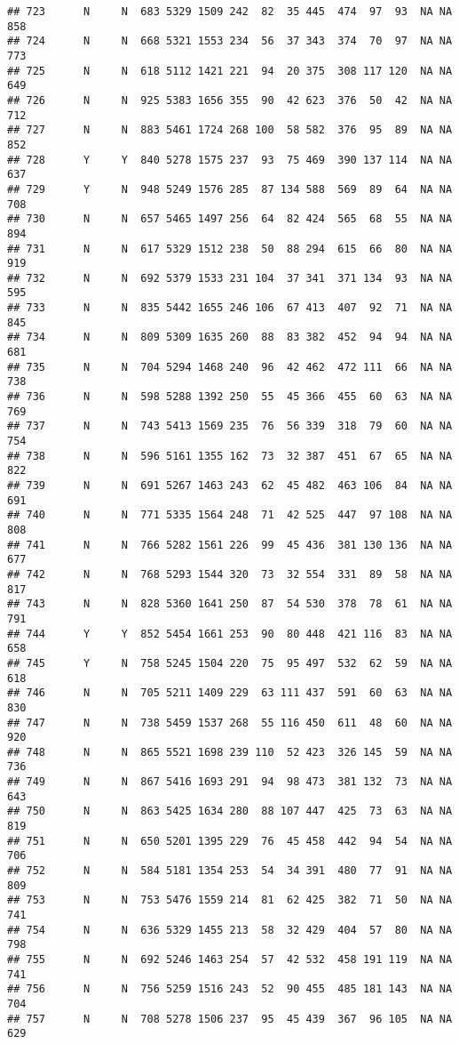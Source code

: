 \documentclass[]{article}
\begin{document}
\begin{verbatim}
## 723      N     N  683 5329 1509 242  82  35 445  474  97  93  NA NA  858
## 724      N     N  668 5321 1553 234  56  37 343  374  70  97  NA NA  773
## 725      N     N  618 5112 1421 221  94  20 375  308 117 120  NA NA  649
## 726      N     N  925 5383 1656 355  90  42 623  376  50  42  NA NA  712
## 727      N     N  883 5461 1724 268 100  58 582  376  95  89  NA NA  852
## 728      Y     Y  840 5278 1575 237  93  75 469  390 137 114  NA NA  637
## 729      Y     N  948 5249 1576 285  87 134 588  569  89  64  NA NA  708
## 730      N     N  657 5465 1497 256  64  82 424  565  68  55  NA NA  894
## 731      N     N  617 5329 1512 238  50  88 294  615  66  80  NA NA  919
## 732      N     N  692 5379 1533 231 104  37 341  371 134  93  NA NA  595
## 733      N     N  835 5442 1655 246 106  67 413  407  92  71  NA NA  845
## 734      N     N  809 5309 1635 260  88  83 382  452  94  94  NA NA  681
## 735      N     N  704 5294 1468 240  96  42 462  472 111  66  NA NA  738
## 736      N     N  598 5288 1392 250  55  45 366  455  60  63  NA NA  769
## 737      N     N  743 5413 1569 235  76  56 339  318  79  60  NA NA  754
## 738      N     N  596 5161 1355 162  73  32 387  451  67  65  NA NA  822
## 739      N     N  691 5267 1463 243  62  45 482  463 106  84  NA NA  691
## 740      N     N  771 5335 1564 248  71  42 525  447  97 108  NA NA  808
## 741      N     N  766 5282 1561 226  99  45 436  381 130 136  NA NA  677
## 742      N     N  768 5293 1544 320  73  32 554  331  89  58  NA NA  817
## 743      N     N  828 5360 1641 250  87  54 530  378  78  61  NA NA  791
## 744      Y     Y  852 5454 1661 253  90  80 448  421 116  83  NA NA  658
## 745      Y     N  758 5245 1504 220  75  95 497  532  62  59  NA NA  618
## 746      N     N  705 5211 1409 229  63 111 437  591  60  63  NA NA  830
## 747      N     N  738 5459 1537 268  55 116 450  611  48  60  NA NA  920
## 748      N     N  865 5521 1698 239 110  52 423  326 145  59  NA NA  736
## 749      N     N  867 5416 1693 291  94  98 473  381 132  73  NA NA  643
## 750      N     N  863 5425 1634 280  88 107 447  425  73  63  NA NA  819
## 751      N     N  650 5201 1395 229  76  45 458  442  94  54  NA NA  706
## 752      N     N  584 5181 1354 253  54  34 391  480  77  91  NA NA  809
## 753      N     N  753 5476 1559 214  81  62 425  382  71  50  NA NA  741
## 754      N     N  636 5329 1455 213  58  32 429  404  57  80  NA NA  798
## 755      N     N  692 5246 1463 254  57  42 532  458 191 119  NA NA  741
## 756      N     N  756 5259 1516 243  52  90 455  485 181 143  NA NA  704
## 757      N     N  708 5278 1506 237  95  45 439  367  96 105  NA NA  629

\end{verbatim}
\end{document}
